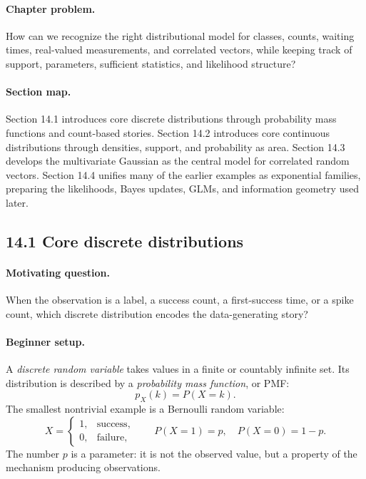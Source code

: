 \paragraph{Chapter problem.}
How can we recognize the right distributional model for classes, counts, waiting times, real-valued measurements, and correlated vectors, while keeping track of support, parameters, sufficient statistics, and likelihood structure?

\paragraph{Section map.}
Section 14.1 introduces core discrete distributions through probability mass functions and count-based stories. Section 14.2 introduces core continuous distributions through densities, support, and probability as area. Section 14.3 develops the multivariate Gaussian as the central model for correlated random vectors. Section 14.4 unifies many of the earlier examples as exponential families, preparing the likelihoods, Bayes updates, GLMs, and information geometry used later.

\subsection{14.1 Core discrete distributions}

\paragraph{Motivating question.}
When the observation is a label, a success count, a first-success time, or a spike count, which discrete distribution encodes the data-generating story?

\paragraph{Beginner setup.}
A \emph{discrete random variable} takes values in a finite or countably infinite set. Its distribution is described by a \emph{probability mass function}, or PMF:
\[
p_X(k)=P(X=k).
\]
The smallest nontrivial example is a Bernoulli random variable:
\[
X=
\begin{cases}
1, & \text{success},\\
0, & \text{failure},
\end{cases}
\qquad
P(X=1)=p,\quad P(X=0)=1-p.
\]
The number \(p\) is a parameter: it is not the observed value, but a property of the mechanism producing observations.

